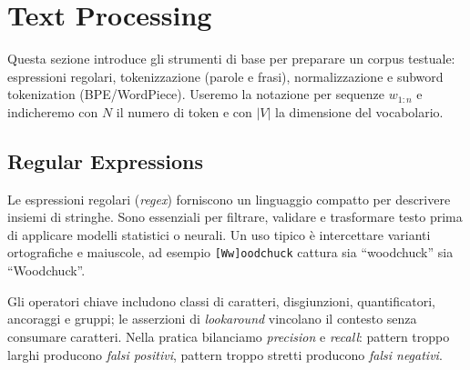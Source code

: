 
\blank
\newpage

\section{Text Processing}

    Questa sezione introduce gli strumenti di base per preparare un corpus testuale: espressioni regolari, tokenizzazione (parole e frasi), normalizzazione e subword tokenization (BPE/WordPiece). Useremo la notazione per sequenze \(w_{1:n}\) e indicheremo con \(N\) il numero di token e con \(|V|\) la dimensione del vocabolario.
    
    \subsection{Regular Expressions}
    
        Le espressioni regolari (\textit{regex}) forniscono un linguaggio compatto per descrivere insiemi di stringhe. Sono essenziali per filtrare, validare e trasformare testo prima di applicare modelli statistici o neurali. Un uso tipico è intercettare varianti ortografiche e maiuscole, ad esempio \texttt{[Ww]oodchuck} cattura sia ``woodchuck'' sia ``Woodchuck''. 
        
        Gli operatori chiave includono classi di caratteri, disgiunzioni, quantificatori, ancoraggi e gruppi; le asserzioni di \emph{lookaround} vincolano il contesto senza consumare caratteri. Nella pratica bilanciamo \emph{precision} e \emph{recall}: pattern troppo larghi producono \textit{falsi positivi}, pattern troppo stretti producono \textit{falsi negativi}.
        
